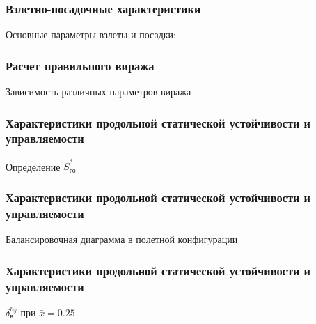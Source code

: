 \documentclass{beamer}
\begin{document}
\begin{frame}[t]
    \frametitle{Взлетно-посадочные характеристики}
    \vfill
    \begin{center}
        Основные параметры взлеты и посадки:
        
    \end{center}
    \vfill
\end{frame}

\begin{frame}[t]
    \frametitle{Расчет правильного виража}
    \begin{center}
        Зависимость различных параметров виража
        \resizebox{.79\linewidth}{!}{}
    \end{center}
\end{frame}

\begin{frame}[t]
    \frametitle{Характеристики продольной статической устойчивости и управляемости}
   \begin{center}
       Определение $\bar{S}_{го}^*$ 
       \resizebox{.79\linewidth}{!}{}
   \end{center} 
\end{frame}

\begin{frame}[t]
    \frametitle{Характеристики продольной статической устойчивости и управляемости}
    \begin{center}
        Балансировочная диаграмма в полетной конфигурации 
        \resizebox{.79\linewidth}{!}{}
    \end{center}
\end{frame}

\begin{frame}[t]
    \frametitle{Характеристики продольной статической устойчивости и управляемости}
    \begin{center}
        $\delta_{в}^{n_y}$ при $\bar{x} = 0.25$
        \resizebox{.79\linewidth}{!}{}
    \end{center}
\end{frame}
\end{document}
